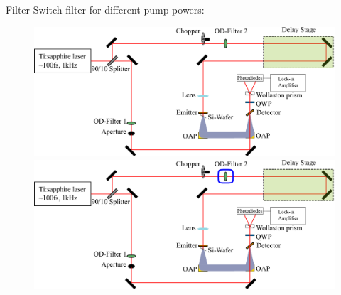 \documentclass[aspectratio=1610, 9pt]{beamer}
\begin{document}
\begin{frame}{Filter}
  Switch filter for different pump powers:
  \begin{figure}
    \begin{overprint}
      \includegraphics[width=\textwidth]{images/Aufbau.pdf}
      \includegraphics[width=\textwidth]{images/Aufbau_blue_square.pdf}
    \end{overprint}
  \end{figure}  
\end{frame}
\end{document}
